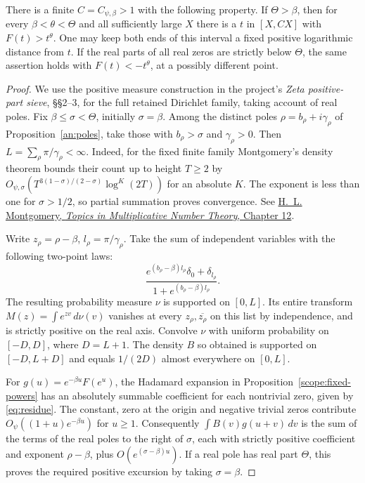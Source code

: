 \begin{lemma}
\label{scope:fixed-ratio}
There is a finite \(C=C_{\psi,\beta}>1\) with the following property.
If \(\Theta>\beta\), then for every \(\beta<\theta<\Theta\) and
all sufficiently large \(X\) there is a \(t\) in \([X,CX]\) with
\(F(t)>t^\theta\). One may keep both ends of this interval a fixed
positive logarithmic distance from \(t\). If the real parts of all
real zeros are strictly below \(\Theta\), the same assertion holds
with \(F(t)<-t^\theta\), at a possibly different point.
\end{lemma}
\begin{proof}
We use the positive measure construction in the project's
\emph{Zeta positive-part sieve}, \S\S2--3, for the full retained
Dirichlet family, taking account of real poles. Fix
\(\beta\le\sigma<\Theta\), initially \(\sigma=\beta\).
Among the distinct poles \(\rho=b_\rho+i\gamma_\rho\) of
Proposition~\ref{an:poles}, take those with \(b_\rho>\sigma\) and
\(\gamma_\rho>0\). Then \(L=\sum_\rho\pi/\gamma_\rho<\infty\).
Indeed, for the fixed finite family Montgomery's density theorem
bounds their count up to height \(T\ge2\) by
\(O_{\psi,\sigma}(T^{3(1-\sigma)/(2-\sigma)}\log^{K}(2T))\)
for an absolute \(K\).
The exponent is less than one for \(\sigma>1/2\), so partial
summation proves convergence. See
\href{https://link.springer.com/book/10.1007/BFb0060851}{H.~L. Montgomery,
\emph{Topics in Multiplicative Number Theory}, Chapter 12}.

Write \(z_\rho=\rho-\beta\), \(l_\rho=\pi/\gamma_\rho\). Take the
sum of independent variables with the following two-point laws:
\[
   \frac{e^{(b_\rho-\beta)l_\rho}\delta_0+\delta_{l_\rho}}
        {1+e^{(b_\rho-\beta)l_\rho}} .
\]
The resulting probability measure \(\nu\) is supported on \([0,L]\).
Its entire transform \(M(z)=\int e^{zv}\,d\nu(v)\) vanishes at
every \(z_\rho,\overline{z_\rho}\) on this list by independence,
and is strictly positive on the real axis. Convolve \(\nu\) with
uniform probability on \([-D,D]\), where \(D=L+1\). The density
\(B\) so obtained is supported on \([-D,L+D]\) and equals
\(1/(2D)\) almost everywhere on \([0,L]\).

For \(g(u)=e^{-\beta u}F(e^u)\), the Hadamard expansion in
Proposition~\ref{scope:fixed-powers} has an absolutely summable
coefficient for each nontrivial zero, given by \eqref{eq:residue}.
The constant, zero at the origin and negative trivial zeros contribute
\(O_\psi((1+u)e^{-\beta u})\) for \(u\ge1\). Consequently
\(\int B(v)g(u+v)\,dv\) is the sum of the terms of the real poles
to the right of \(\sigma\), each with strictly positive coefficient
and exponent \(\rho-\beta\), plus \(O(e^{(\sigma-\beta)u})\).
If a real pole has real part \(\Theta\), this proves the required
positive excursion by taking \(\sigma=\beta\).


\end{proof}
